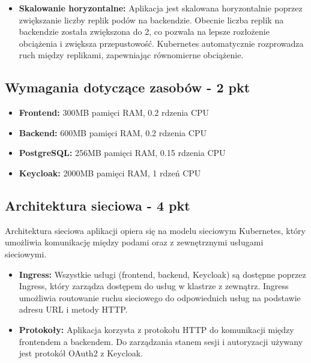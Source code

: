 \documentclass[12pt,a4paper]{article}
\begin{document}
\begin{itemize}
\item \textbf{Skalowanie horyzontalne:} Aplikacja jest skalowana horyzontalnie poprzez zwiększanie liczby replik podów na backendzie. Obecnie liczba replik na backendzie została zwiększona do 2, co pozwala na lepsze rozłożenie obciążenia i zwiększa przepustowość. Kubernetes automatycznie rozprowadza ruch między replikami, zapewniając równomierne obciążenie.

\end{itemize}

\subsection{Wymagania dotyczące zasobów - 2 pkt}
\label{sec:ExampleTables}

\begin{itemize}
\item \textbf{Frontend:} 300MB pamięci RAM, 0.2 rdzenia CPU
\item \textbf{Backend:} 600MB pamięci RAM, 0.2 rdzenia CPU
\item \textbf{PostgreSQL:} 256MB pamięci RAM, 0.15 rdzenia CPU
\item \textbf{Keycloak:} 2000MB pamięci RAM, 1 rdzeń CPU
\end{itemize}


\subsection{Architektura sieciowa - 4 pkt}
\label{sec:ExampleResults}

Architektura sieciowa aplikacji opiera się na modelu sieciowym Kubernetes, który umożliwia komunikację między podami oraz z zewnętrznymi usługami sieciowymi.

\begin{itemize}
\item \textbf{Ingress:} Wszystkie usługi (frontend, backend, Keycloak) są dostępne poprzez Ingress, który zarządza dostępem do usług w klastrze z zewnątrz. Ingress umożliwia routowanie ruchu sieciowego do odpowiednich usług na podstawie adresu URL i metody HTTP.

\item \textbf{Protokoły:} Aplikacja korzysta z protokołu HTTP do komunikacji między frontendem a backendem. Do zarządzania stanem sesji i autoryzacji używany jest protokół OAuth2 z Keycloak.

\end{itemize}

\nocite{*}
\end{document}

